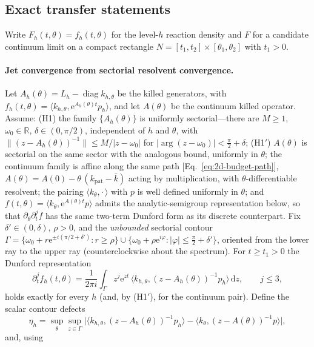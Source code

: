 \documentclass[aps,pre,reprint,amsmath,amssymb,longbibliography,floatfix]{revtex4-2}
\newcommand{\dd}{\mathrm d}
\newcommand{\e}{\mathrm e}
\begin{document}
\subsection{Exact transfer statements}
\label{sec:bridge-theory}

Write \(F_h(t,\theta)=f_h(t,\theta)\) for the level-\(h\)
reaction density and \(F\) for a candidate continuum limit on a compact
rectangle \(N=[t_1,t_2]\times[\theta_1,\theta_2]\) with \(t_1>0\).

\paragraph{Jet convergence from sectorial resolvent convergence.}
Let \(A_h(\theta)=L_h-\operatorname{diag}k_{h,\theta}\) be the killed
generators, with
\(f_h(t,\theta)=\langle k_{h,\theta},\e^{A_h(\theta)t}p_h\rangle\), and let
\(A(\theta)\) be the continuum killed operator. Assume:
(H1) the family \(\{A_h(\theta)\}\) is uniformly sectorial---there are
\(M\ge1\), \(\omega_0\in\mathbb R\), \(\delta\in(0,\pi/2)\), independent of
\(h\) and \(\theta\), with \(\|(z-A_h(\theta))^{-1}\|\le M/|z-\omega_0|\) for
\(|\arg(z-\omega_0)|<\tfrac\pi2+\delta\);
(H1$'$) \(A(\theta)\) is sectorial on the same sector with the analogous
bound, uniformly in \(\theta\); the continuum family is affine along the
same path [Eq.~\eqref{eq:2d-budget-path}], \(A(\theta)=A(0)-\theta\,(k_{\mathrm{pat}}-\bar k)\) acting by
multiplication, with \(\theta\)-differentiable resolvent; the pairing
\(\langle k_\theta,\cdot\,\rangle\) with \(p\) is well defined uniformly in
\(\theta\); and \(f(t,\theta)=\langle k_\theta,\e^{A(\theta)t}p\rangle\)
admits the analytic-semigroup representation below, so that
\(\partial_\theta\partial_t^jf\) has the same two-term Dunford form as its
discrete counterpart. Fix \(\delta'\in(0,\delta)\), \(\rho>0\), and the
\emph{unbounded} sectorial contour
\(\Gamma=\{\omega_0+r\e^{\pm i(\pi/2+\delta')}:r\ge\rho\}\cup
\{\omega_0+\rho\e^{i\varphi}:|\varphi|\le\tfrac\pi2+\delta'\}\),
oriented from the lower ray to the upper ray (counterclockwise about the
spectrum). For \(t\ge t_1>0\) the Dunford representation
\[
\partial_t^jf_h(t,\theta)
=\frac1{2\pi i}\int_\Gamma z^j\e^{zt}\,
\langle k_{h,\theta},(z-A_h(\theta))^{-1}p_h\rangle\,\dd z,
\qquad j\le3,
\]
holds exactly for every \(h\) (and, by (H1$'$), for the continuum pair).
Define the scalar contour defects
\[
\eta_h=\sup_{\theta}\sup_{z\in\Gamma}
\big|\langle k_{h,\theta},(z-A_h(\theta))^{-1}p_h\rangle
-\langle k_{\theta},(z-A(\theta))^{-1}p\rangle\big|,
\]
and, using
\end{document}
